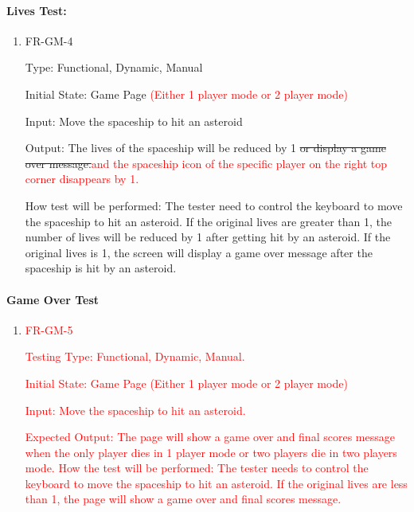 \documentclass[12pt, titlepage]{article}
\begin{document}
\paragraph{Lives Test:}
\begin{enumerate}					
\item{FR-GM-4\\}

Type: Functional, Dynamic, Manual
					
Initial State: Game Page \textcolor{red}{(Either 1 player mode or 2 player mode)}
					
Input: Move the spaceship to hit an asteroid
					
Output:  The lives of the spaceship will be reduced by 1 \sout{or display a game over message.}\textcolor{red}{and the spaceship icon of the specific player on the right top corner
disappears by 1.
}

How test will be performed:  The tester need to control the keyboard to move the spaceship to hit an asteroid. If the original lives are greater than 1, the number of lives will be reduced by 1 after getting hit by an asteroid. If the original lives is 1, the screen will display a game over message after the spaceship is hit by an asteroid. 
\end{enumerate}

\paragraph{Game Over Test}
\begin{enumerate}					
\item{\textcolor{red}{FR-GM-5}\\}

\textcolor{red}{Testing Type: Functional, Dynamic, Manual.}

\textcolor{red}{Initial State:  Game Page (Either 1 player mode or 2 player mode)}

\textcolor{red}{Input:  Move the spaceship to hit an asteroid.}

\textcolor{red}{Expected Output: The page will show a game over and final scores
message when the only player dies in 1 player mode or two players die
in two players mode.
}
\textcolor{red}{How the test will be performed: The tester needs to control the keyboard to move the spaceship to hit an asteroid. If the original lives are less than 1, the page will show a game over and final scores message.}
\end{enumerate}
\end{document}
